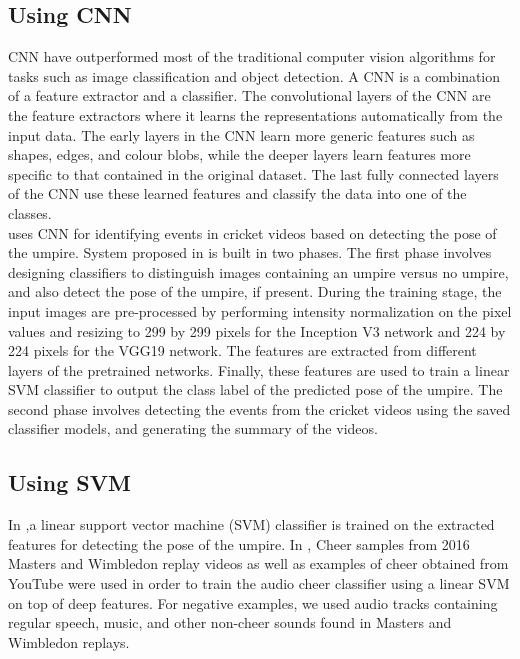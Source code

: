 \subsection{Using CNN}
CNN have outperformed most of the traditional computer vision algorithms for tasks such as image classification and object detection. A CNN is a combination of a feature extractor and a classifier. The convolutional layers of the CNN are the feature extractors where it learns the representations automatically from the input data. The early layers in the CNN learn more generic features such as shapes, edges, and colour blobs, while the deeper layers learn features more specific to that contained in the original dataset. The last fully connected layers of the CNN use these learned features and classify the data into one of the classes. \\\cite{DBLP:journals/corr/abs-1809-06217} uses CNN for identifying events in cricket videos based on detecting the pose of the umpire. System proposed in\cite{DBLP:journals/corr/abs-1809-06217} is built in two phases. The first phase involves designing classifiers to distinguish images containing an umpire versus no umpire, and also detect the pose of the umpire, if present. During the training stage, the input images are pre-processed by performing intensity normalization on the pixel values and resizing to 299 by 299 pixels for the Inception V3 network and 224 by 224 pixels for the VGG19 network. The features are extracted from different layers of the pretrained networks. Finally, these features are used to train a linear SVM classifier to output the class label of the predicted pose of the umpire. The second phase involves detecting the events from the cricket videos using the saved classifier models, and generating the summary of the videos.

\subsection{Using SVM}
In \cite{DBLP:journals/corr/abs-1809-06217},a linear support vector machine (SVM) classifier is trained on the extracted features for detecting the pose of the umpire.
 In \cite{8491305}, Cheer samples from 2016 Masters and Wimbledon replay videos as well as examples of cheer obtained from YouTube were used in order to train the audio cheer classiﬁer using a linear SVM on top of deep features. For negative examples, we used audio tracks containing regular speech, music, and other non-cheer sounds   found in Masters and Wimbledon replays.
